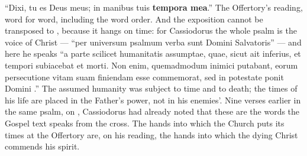 \begin{witnessnote}
``Dixi, tu es Deus meus; in manibus tuis \textbf{tempora mea}.'' The Offertory's
reading, word for word, including the word order. And the exposition cannot be
transposed to , because it hangs on time: for Cassiodorus the
whole psalm is the voice of Christ --- ``per universum psalmum verba sunt
Domini Salvatoris'' --- and here he speaks ``a parte scilicet humanitatis
assumptae, quae, sicut ait inferius, et tempori subiacebat et morti. Non enim,
quemadmodum inimici putabant, eorum persecutione vitam suam finiendam esse
commemorat, sed in potestate ponit Domini .'' The
assumed humanity was subject to time and to death; the times of his life are
placed in the Father's power, not in his enemies'. Nine verses earlier in the
same psalm, on , Cassiodorus had
already noted that these are the words the Gospel text speaks from the cross.
The hands into which the Church puts its times at the Offertory are, on his
reading, the hands into which the dying Christ commends his spirit.
\end{witnessnote}

